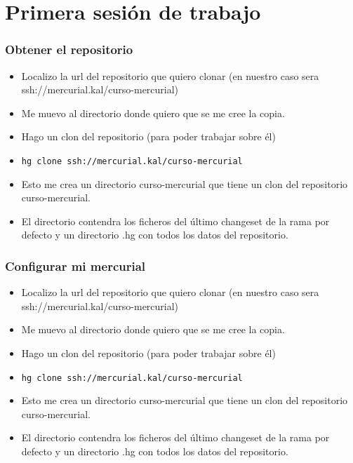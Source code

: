 \documentclass[10pt]{beamer}
\begin{document}
  \section*{Primera sesión de trabajo}

  \begin{frame}[containsverbatim]
    \frametitle{Obtener el repositorio}
    \begin{itemize}
      \item Localizo la url del repositorio que quiero clonar (en nuestro caso sera ssh://mercurial.kal/curso-mercurial)
      \item Me muevo al directorio donde quiero que se me cree la copia.
      \item Hago un clon del repositorio (para poder trabajar sobre él)
      \item \verb+hg clone ssh://mercurial.kal/curso-mercurial+
      \item Esto me crea un directorio curso-mercurial que tiene un clon del repositorio curso-mercurial.
      \item El directorio contendra los ficheros del último changeset de la rama por defecto y un directorio .hg con todos los datos del repositorio.
    \end{itemize}
  \end{frame}

  \begin{frame}[containsverbatim]
    \frametitle{Configurar mi mercurial}
    \begin{itemize}
      \item Localizo la url del repositorio que quiero clonar (en nuestro caso sera ssh://mercurial.kal/curso-mercurial)
      \item Me muevo al directorio donde quiero que se me cree la copia.
      \item Hago un clon del repositorio (para poder trabajar sobre él)
      \item \verb+hg clone ssh://mercurial.kal/curso-mercurial+
      \item Esto me crea un directorio curso-mercurial que tiene un clon del repositorio curso-mercurial.
      \item El directorio contendra los ficheros del último changeset de la rama por defecto y un directorio .hg con todos los datos del repositorio.
    \end{itemize}
  \end{frame}
\end{document}
